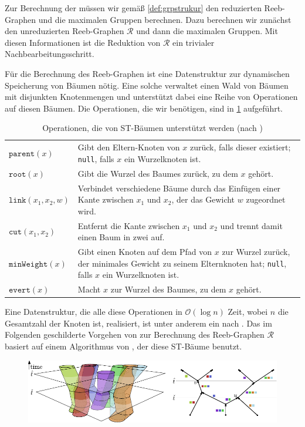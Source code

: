 Zur Berechnung der \GrpStruktur müssen wir gemäß \cref{def:grpstrukur} den reduzierten Reeb-Graphen und die maximalen Gruppen berechnen.
Dazu berechnen wir zunächst den unreduzierten Reeb-Graphen $\mathcal{R}$ und dann die maximalen Gruppen.
Mit diesen Informationen ist die Reduktion von $\mathcal{R}$ ein trivialer Nachbearbeitungsschritt.

Für die Berechnung des Reeb-Graphen ist eine Datenstruktur zur dynamischen Speicherung von Bäumen nötig.
Eine solche verwaltet einen Wald von Bäumen mit disjunkten Knotenmengen und unterstützt dabei eine Reihe von Operationen auf diesen Bäumen.
Die Operationen, die wir benötigen, sind in \cref{tbl:operationenST} aufgeführt.
\begin{table}[p]
	\Centering
	\caption{Operationen, die von ST-Bäumen unterstützt werden (nach \cite{parsaReeb})}\label{tbl:operationenST}
	\begin{tabular}{lp{}}
		\toprule
		$\mathtt{parent}(x)$ & Gibt den Eltern-Knoten von $x$ zurück, falls dieser existiert; \texttt{null}, falls $x$ ein Wurzelknoten ist.\\
		$\mathtt{root}(x)$ & Gibt die Wurzel des Baumes zurück, zu dem $x$ gehört.\\
		$\mathtt{link}(x_1,x_2,w)$ & Verbindet verschiedene Bäume durch das Einfügen einer Kante zwischen $x_1$ und $x_2$, der das Gewicht $w$ zugeordnet wird.\\
		$\mathtt{cut}(x_1,x_2)$ & Entfernt die Kante zwischen $x_1$ und $x_2$ und trennt damit einen Baum in zwei auf.\\
		$\mathtt{minWeight}(x)$ & Gibt einen Knoten auf dem Pfad von $x$ zur Wurzel zurück, der minimales Gewicht zu seinem Elternknoten hat; \texttt{null}, falls $x$ ein Wurzelknoten ist.\\
		$\mathtt{evert}(x)$ & Macht $x$ zur Wurzel des Baumes, zu dem $x$ gehört.\\
		\bottomrule
	\end{tabular}
\end{table}
Eine Datenstruktur, die alle diese Operationen in $\mathcal{O}(\log n)$ Zeit, wobei $n$ die Gesamtzahl der Knoten ist, realisiert, ist unter anderem ein  nach \textcite{dynamictrees}.
Das im Folgenden geschilderte Vorgehen von \textcite{buchin2015} zur Berechnung des Reeb-Graphen $\mathcal{R}$ basiert auf einem Algorithmus von \textcite{parsaReeb}, der diese ST-Bäume benutzt.

\begin{figure}[hbt]
	\Centering
	\includegraphics[width=.8\textwidth]{Bilder/manifold.pdf}
\end{figure}

